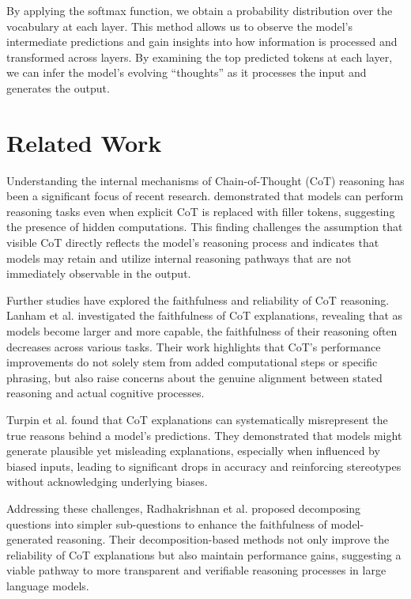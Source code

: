 \documentclass{article}
\begin{document}
By applying the softmax function, we obtain a probability distribution over the vocabulary at each layer. This method allows us to observe the model's intermediate predictions and gain insights into how information is processed and transformed across layers. By examining the top predicted tokens at each layer, we can infer the model's evolving ``thoughts'' as it processes the input and generates the output.

\newpage
\section{Related Work}

Understanding the internal mechanisms of Chain-of-Thought (CoT) reasoning has been a significant focus of recent research. \cite{pfau2023let} demonstrated that models can perform reasoning tasks even when explicit CoT is replaced with filler tokens, suggesting the presence of hidden computations. This finding challenges the assumption that visible CoT directly reflects the model's reasoning process and indicates that models may retain and utilize internal reasoning pathways that are not immediately observable in the output.

Further studies have explored the faithfulness and reliability of CoT reasoning. Lanham et al. \cite{lanham2023measuringfaithfulnesschainofthoughtreasoning} investigated the faithfulness of CoT explanations, revealing that as models become larger and more capable, the faithfulness of their reasoning often decreases across various tasks. Their work highlights that CoT's performance improvements do not solely stem from added computational steps or specific phrasing, but also raise concerns about the genuine alignment between stated reasoning and actual cognitive processes.

Turpin et al. \cite{turpin2023languagemodelsdontsay} found that CoT explanations can systematically misrepresent the true reasons behind a model's predictions. They demonstrated that models might generate plausible yet misleading explanations, especially when influenced by biased inputs, leading to significant drops in accuracy and reinforcing stereotypes without acknowledging underlying biases.

Addressing these challenges, Radhakrishnan et al. \cite{radhakrishnan2023questiondecompositionimprovesfaithfulness} proposed decomposing questions into simpler sub-questions to enhance the faithfulness of model-generated reasoning. Their decomposition-based methods not only improve the reliability of CoT explanations but also maintain performance gains, suggesting a viable pathway to more transparent and verifiable reasoning processes in large language models.
\end{document}
